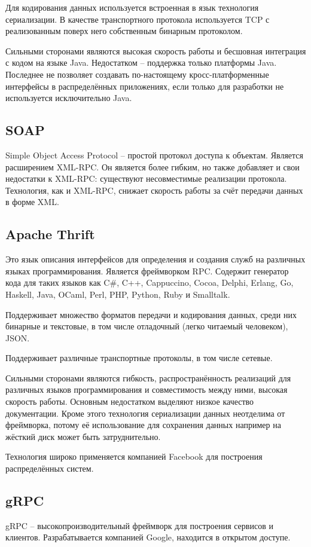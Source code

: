 Для кодирования данных используется встроенная в язык технология сериализации.
В качестве транспортного протокола используется TCP с реализованным
поверх него собственным бинарным протоколом.

Сильными сторонами являются высокая скорость работы и бесшовная интеграция
с кодом на языке Java. Недостатком -- поддержка только платформы Java.
Последнее не позволяет создавать по-настоящему кросс-платформенные интерфейсы
в распределённых приложениях, если только для разработки не используется
исключительно Java.

\subsection{SOAP}
Simple Object Access Protocol -- простой протокол доступа к объектам.
Является расширением XML-RPC. Он является более гибким, но также добавляет
и свои недостатки к XML-RPC: существуют несовместимые реализации протокола.
Технология, как и XML-RPC, снижает скорость работы за счёт передачи данных
в форме XML.

\subsection{Apache Thrift}
Это язык описания интерфейсов для определения и создания служб
на различных языках программирования. Является фреймворком RPC.
Содержит генератор кода для таких языков как C\#, C++, Cappuccino, Cocoa,
Delphi, Erlang, Go, Haskell, Java, OCaml, Perl, PHP, Python, Ruby и Smalltalk.

Поддерживает множество форматов передачи и кодирования данных, среди них
бинарные и текстовые, в том числе отладочный (легко читаемый человеком), JSON.

Поддерживает различные транспортные протоколы, в том числе сетевые.

Сильными сторонами являются гибкость, распространённость реализаций
для различных языков программирования и совместимость между ними, высокая
скорость работы.
Основным недостатком выделяют низкое качество документации.
Кроме этого технология сериализации данных неотделима от фреймворка,
потому её использование для сохранения данных например на жёсткий диск
может быть затруднительно.

Технология широко применяется компанией Facebook для построения распределённых
систем.

\subsection{gRPC}
gRPC -- высокопроизводительный фреймворк для построения сервисов и клиентов.
Разрабатывается компанией Google, находится в открытом доступе.

